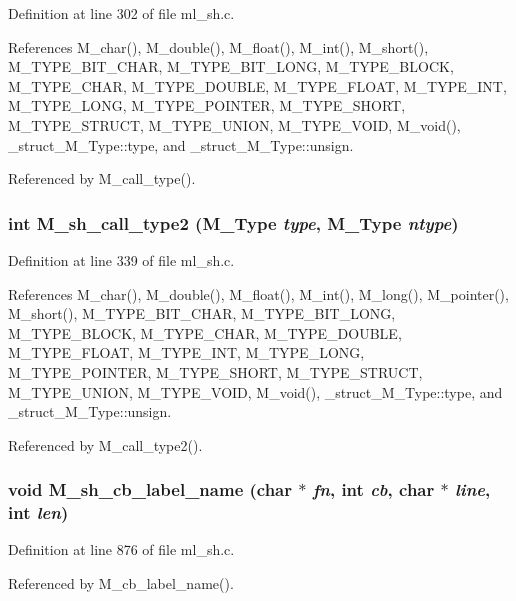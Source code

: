 Definition at line 302 of file ml\_\-sh.c.

References M\_\-char(), M\_\-double(), M\_\-float(), M\_\-int(), M\_\-short(), M\_\-TYPE\_\-BIT\_\-CHAR, M\_\-TYPE\_\-BIT\_\-LONG, M\_\-TYPE\_\-BLOCK, M\_\-TYPE\_\-CHAR, M\_\-TYPE\_\-DOUBLE, M\_\-TYPE\_\-FLOAT, M\_\-TYPE\_\-INT, M\_\-TYPE\_\-LONG, M\_\-TYPE\_\-POINTER, M\_\-TYPE\_\-SHORT, M\_\-TYPE\_\-STRUCT, M\_\-TYPE\_\-UNION, M\_\-TYPE\_\-VOID, M\_\-void(), \_\-struct\_\-M\_\-Type::type, and \_\-struct\_\-M\_\-Type::unsign.

Referenced by M\_\-call\_\-type().
\subsubsection{\setlength{\rightskip}{0pt plus 5cm}int M\_\-sh\_\-call\_\-type2 (\bf{M\_\-Type} {\em type}, \bf{M\_\-Type} {\em ntype})}\label{ml__sh_8c_7e81b132d025b2e7cb5fecf3bc3feadc}




Definition at line 339 of file ml\_\-sh.c.

References M\_\-char(), M\_\-double(), M\_\-float(), M\_\-int(), M\_\-long(), M\_\-pointer(), M\_\-short(), M\_\-TYPE\_\-BIT\_\-CHAR, M\_\-TYPE\_\-BIT\_\-LONG, M\_\-TYPE\_\-BLOCK, M\_\-TYPE\_\-CHAR, M\_\-TYPE\_\-DOUBLE, M\_\-TYPE\_\-FLOAT, M\_\-TYPE\_\-INT, M\_\-TYPE\_\-LONG, M\_\-TYPE\_\-POINTER, M\_\-TYPE\_\-SHORT, M\_\-TYPE\_\-STRUCT, M\_\-TYPE\_\-UNION, M\_\-TYPE\_\-VOID, M\_\-void(), \_\-struct\_\-M\_\-Type::type, and \_\-struct\_\-M\_\-Type::unsign.

Referenced by M\_\-call\_\-type2().
\subsubsection{\setlength{\rightskip}{0pt plus 5cm}void M\_\-sh\_\-cb\_\-label\_\-name (char $\ast$ {\em fn}, int {\em cb}, char $\ast$ {\em line}, int {\em len})}\label{ml__sh_8c_5336e99237f6e7db25b0df9a947c375c}




Definition at line 876 of file ml\_\-sh.c.

Referenced by M\_\-cb\_\-label\_\-name().
